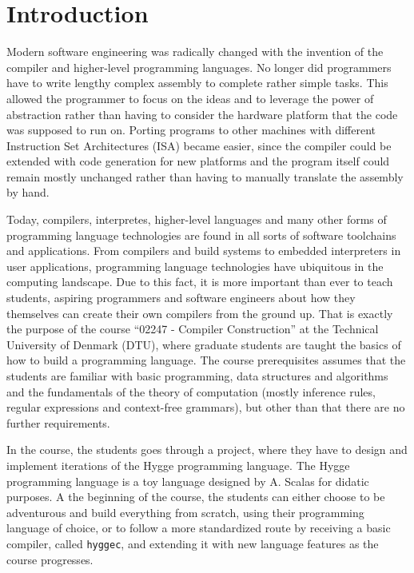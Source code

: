 \chapter{Introduction}

Modern software engineering was radically changed with the invention of the compiler and higher-level programming languages.
No longer did programmers have to write lengthy complex assembly to complete rather simple tasks. This allowed the
programmer to focus on the ideas and to leverage the power of abstraction rather than having to consider the hardware
platform that the code was supposed to run on. Porting programs to other machines with different Instruction Set Architectures
(ISA) became easier, since the compiler could be extended with code generation for new platforms and the program itself
could remain mostly unchanged rather than having to manually translate the assembly by hand. 

Today, compilers, interpretes, higher-level languages and many other forms of programming language technologies are found
in all sorts of software toolchains and applications. From compilers and build systems to embedded interpreters in user
applications, programming language technologies have ubiquitous in the computing landscape. Due to this fact, it is
more important than ever to teach students, aspiring programmers and software engineers about how they themselves
can create their own compilers from the ground up. That is exactly the purpose of the course ``02247 - Compiler Construction''
at the Technical University of Denmark (DTU), where graduate students are taught the basics of how to build a programming language.
The course prerequisites assumes that the students are familiar with basic programming, data structures and algorithms and
the fundamentals of the theory of computation (mostly inference rules, regular expressions and context-free grammars), but
other than that there are no further requirements.

In the course, the students goes through a project, where they have to design and implement iterations of the Hygge programming language.
The Hygge programming language is a toy language designed by A. Scalas for didatic purposes. A the beginning of the course,
the students can either choose to be adventurous and build everything from scratch, using their programming language of choice,
or to follow a more standardized route by receiving a basic compiler, called \texttt{hyggec}, and extending it with new
language features as the course progresses.

